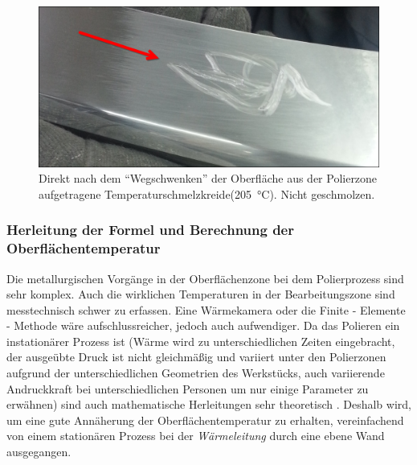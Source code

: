 \documentclass[12pt,a4paper,parskip]{scrartcl}
\begin{document}
\begin{figure}[H]
\centering
\includegraphics[width=.8\textwidth]{Kreide}
\caption{Direkt nach dem "`Wegschwenken"' der Oberfläche aus der Polierzone aufgetragene Temperaturschmelzkreide(\SI{205}{\degreeCelsius}). Nicht geschmolzen.}
\label{kreide}
\end{figure}









\subsubsection{Herleitung der Formel und Berechnung der Oberflächentemperatur}
Die metallurgischen Vorgänge in der Oberflächenzone bei dem Polierprozess sind sehr komplex. Auch die wirklichen Temperaturen in der Bearbeitungszone sind messtechnisch schwer zu erfassen. Eine Wärmekamera oder die Finite - Elemente - Methode wäre aufschlussreicher, jedoch auch aufwendiger. Da das Polieren ein instationärer Prozess ist (Wärme wird zu unterschiedlichen Zeiten eingebracht, der ausgeübte Druck ist nicht gleichmäßig und variiert unter den Polierzonen aufgrund der unterschiedlichen Geometrien des Werkstücks, auch variierende Andruckkraft bei unterschiedlichen Personen um nur einige Parameter zu erwähnen) sind auch mathematische Herleitungen sehr theoretisch . Deshalb wird, um eine gute Annäherung der Oberflächentemperatur zu erhalten, vereinfachend von einem stationären Prozess bei der \emph{Wärmeleitung} durch eine ebene Wand ausgegangen.
\end{document}

